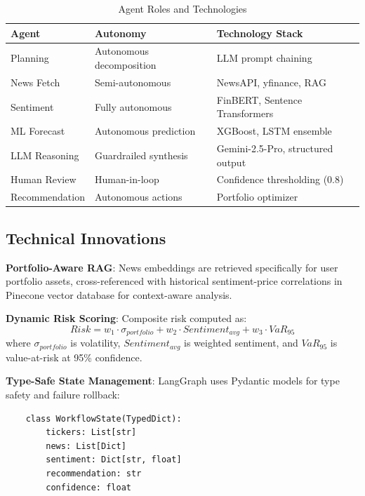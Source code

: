 \documentclass[conference]{IEEEtran}
\begin{document}
    \begin{table}[htbp]
    \caption{Agent Roles and Technologies}
    \begin{center}
    \scriptsize
    \begin{tabular}{|p{1.5cm}|p{2.2cm}|p{2.8cm}|}
    \hline
    \textbf{Agent} & \textbf{Autonomy} & \textbf{Technology Stack} \\
    \hline
    Planning & Autonomous decomposition & LLM prompt chaining \\
    \hline
    News Fetch & Semi-autonomous & NewsAPI, yfinance, RAG \\
    \hline
    Sentiment & Fully autonomous & FinBERT, Sentence Transformers \\
    \hline
    ML Forecast & Autonomous prediction & XGBoost, LSTM ensemble \\
    \hline
    LLM Reasoning & Guardrailed synthesis & Gemini-2.5-Pro, structured output \\
    \hline
    Human Review & Human-in-loop & Confidence thresholding (0.8) \\
    \hline
    Recommendation & Autonomous actions & Portfolio optimizer \\
    \hline
    \end{tabular}
    \label{tab:agents}
    \end{center}
    \end{table}

    \subsection{Technical Innovations}

    \textbf{Portfolio-Aware RAG}: News embeddings are retrieved specifically for user portfolio assets, cross-referenced with historical sentiment-price correlations in Pinecone vector database for context-aware analysis.

    \textbf{Dynamic Risk Scoring}: Composite risk computed as:
    \begin{equation}
    Risk = w_1 \cdot \sigma_{portfolio} + w_2 \cdot Sentiment_{avg} + w_3 \cdot VaR_{95}
    \end{equation}
    where $\sigma_{portfolio}$ is volatility, $Sentiment_{avg}$ is weighted sentiment, and $VaR_{95}$ is value-at-risk at 95\% confidence.

    \textbf{Type-Safe State Management}: LangGraph uses Pydantic models for type safety and failure rollback:
    \begin{verbatim}
    class WorkflowState(TypedDict):
        tickers: List[str]
        news: List[Dict]
        sentiment: Dict[str, float]
        recommendation: str
        confidence: float
    \end{verbatim}
\end{document}
